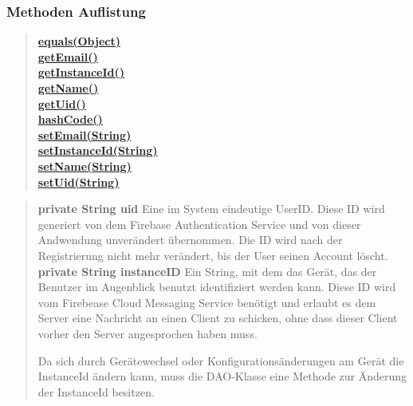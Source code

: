 \documentclass[11pt,a4paper]{article}
\begin{document}
{{{{{{{\subsubsection{Methoden Auflistung}{
\begin{verse}
\hyperlink{edu.kit.pse17.go_app.PersistenceLayer.UserEntity.equals(java.lang.Object)}{{\bf equals(Object)}} \\
\hyperlink{edu.kit.pse17.go_app.PersistenceLayer.UserEntity.getEmail()}{{\bf getEmail()}} \\
\hyperlink{edu.kit.pse17.go_app.PersistenceLayer.UserEntity.getInstanceId()}{{\bf getInstanceId()}} \\
\hyperlink{edu.kit.pse17.go_app.PersistenceLayer.UserEntity.getName()}{{\bf getName()}} \\
\hyperlink{edu.kit.pse17.go_app.PersistenceLayer.UserEntity.getUid()}{{\bf getUid()}} \\
\hyperlink{edu.kit.pse17.go_app.PersistenceLayer.UserEntity.hashCode()}{{\bf hashCode()}} \\
\hyperlink{edu.kit.pse17.go_app.PersistenceLayer.UserEntity.setEmail(java.lang.String)}{{\bf setEmail(String)}} \\
\hyperlink{edu.kit.pse17.go_app.PersistenceLayer.UserEntity.setInstanceId(java.lang.String)}{{\bf setInstanceId(String)}} \\
\hyperlink{edu.kit.pse17.go_app.PersistenceLayer.UserEntity.setName(java.lang.String)}{{\bf setName(String)}} \\
\hyperlink{edu.kit.pse17.go_app.PersistenceLayer.UserEntity.setUid(java.lang.String)}{{\bf setUid(String)}} \\
\end{verse}
}
\begin{verse}
{{\bf private String uid}} Eine im System eindeutige UserID. Diese ID wird generiert von dem Firebase Authentication Service und von dieser Andwendung unverändert
     übernommen. Die ID wird nach der Registrierung nicht mehr verändert, bis der User seinen Account löscht.\\[0.5em]
     
{{\bf private String instanceID}} Ein String, mit dem das Gerät, das der Benutzer im Augenblick benutzt identifiziert werden kann. Diese ID wird vom Firebease Cloud
      Messaging Service benötigt und erlaubt es dem Server eine Nachricht an einen Client zu schicken, ohne dass dieser Client vorher den Server angesprochen
      haben muss.
     
      Da sich durch Gerätewechsel oder Konfigurationsänderungen am Gerät die InstanceId ändern kann, muss die DAO-Klasse eine Methode zur Änderung der InstanceId
      besitzen.\\[0.5em]
      

\end{verse}}}}}}}}
\end{document}
